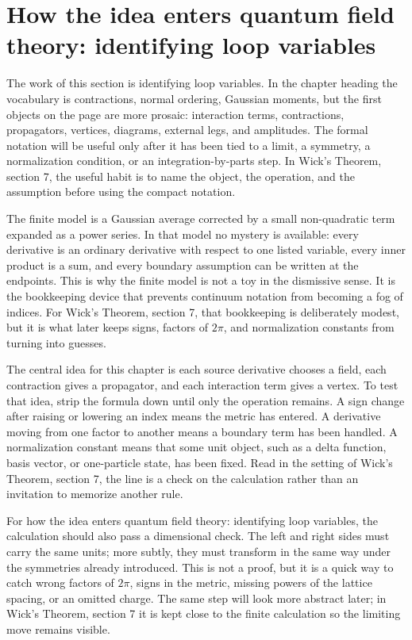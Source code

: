 \section{How the idea enters quantum field theory: identifying loop variables}

The work of this section is identifying loop variables.  In the chapter heading the vocabulary is contractions, normal ordering, Gaussian moments, but the first objects on the page are more prosaic: interaction terms, contractions, propagators, vertices, diagrams, external legs, and amplitudes.  The formal notation will be useful only after it has been tied to a limit, a symmetry, a normalization condition, or an integration-by-parts step.  In Wick's Theorem, section 7, the useful habit is to name the object, the operation, and the assumption before using the compact notation.

The finite model is a Gaussian average corrected by a small non-quadratic term expanded as a power series.  In that model no mystery is available: every derivative is an ordinary derivative with respect to one listed variable, every inner product is a sum, and every boundary assumption can be written at the endpoints.  This is why the finite model is not a toy in the dismissive sense.  It is the bookkeeping device that prevents continuum notation from becoming a fog of indices.  For Wick's Theorem, section 7, that bookkeeping is deliberately modest, but it is what later keeps signs, factors of \(2\pi\), and normalization constants from turning into guesses.

The central idea for this chapter is each source derivative chooses a field, each contraction gives a propagator, and each interaction term gives a vertex.  To test that idea, strip the formula down until only the operation remains.  A sign change after raising or lowering an index means the metric has entered.  A derivative moving from one factor to another means a boundary term has been handled.  A normalization constant means that some unit object, such as a delta function, basis vector, or one-particle state, has been fixed.  Read in the setting of Wick's Theorem, section 7, the line is a check on the calculation rather than an invitation to memorize another rule.

For how the idea enters quantum field theory: identifying loop variables, the calculation should also pass a dimensional check.  The left and right sides must carry the same units; more subtly, they must transform in the same way under the symmetries already introduced.  This is not a proof, but it is a quick way to catch wrong factors of \(2\pi\), signs in the metric, missing powers of the lattice spacing, or an omitted charge.  The same step will look more abstract later; in Wick's Theorem, section 7 it is kept close to the finite calculation so the limiting move remains visible.

